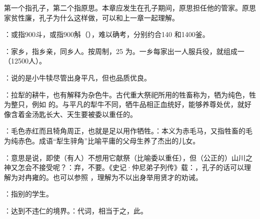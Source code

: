 {
\item 第一个指孔子，第二个指原思。本章应发生在孔子期间，原思担任他的管家。原思家贫性廉，孔子为什么这样做，可以和上一章一起理解。
\item {}：或指900斗，或指900斛（），难以确考，分别约合140 和1400釜。
\item {}：家乡，指乡亲，同乡人。按周制，25 为。一乡每家出一人服兵役，就组成一（12500人）。
}
{}


{
\item {}：说的是小牛犊尽管出身平凡，但也品质优良。

：拉犁的耕牛，也有解释为杂色牛。古代重大祭祀所用的牲畜称为，牺为纯色，牲为整只，例如  的。与平凡的犁牛不同，牺牛品相正血统好，能够养尊处优，就好像含着金汤匙长大、天生要被委以重任的。

：毛色赤红而且犄角周正，也就是足以用作牺牲。：本义为赤毛马，又指牲畜的毛为纯赤色。成语“犁生骍角”比喻平庸的父母生养了杰出的儿女。

\item {}：意思是说，即使（有人）不想用它献祭（比喻委以重任），但（公正的）山川之神又怎会不接受呢？：弃，不要。《史记·仲尼弟子列传》载：，孔子的话可以理解为对冉雍的。也可以参照 ，理解为不以出身举用贤才的劝诫。
}
{}


{
\item {}：指别的学生。
\item {}：达到不违仁的境界。：代词，相当于之，此。
}
{}


